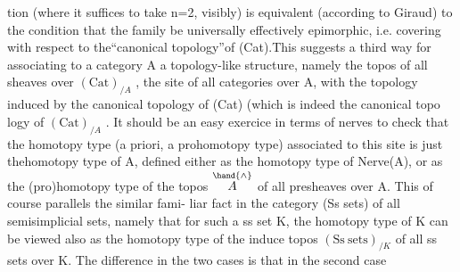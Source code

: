tion (where it suffices to take n=2,  visibly)  is equivalent (according
to Giraud) to the condition that the family be universally effectively
epimorphic,  i.e. covering with respect to the``canonical topology''of
(Cat).This suggests a third way for associating to a \inserted{[small]} category A a
topology-like structure,  namely the topos of all sheaves over
$(\mathrm{Cat})_{/A}$  ,  the site of all categories over A,  with the topology induced
by the canonical topology of (Cat)  (which is indeed the canonical topo\hand{-}%
logy of  $(\mathrm{Cat})_{/A}$ \hand{)}.  It should be an easy exercice in terms of nerves to
check that the homotopy type (a priori,  a prohomotopy type)  associated
to this site is just thehomotopy type of A,  defined either as the
homotopy type of Nerve(A),  or as the (pro)homotopy type of the topos
$\overset{\hand{\wedge}}{A}$ of all presheaves over A.  This of course parallels the similar fami-%
liar fact in the category (Ss sets) of all semisimplicial sets,  namely
that for such a ss set K,  the homotopy type of K can be viewed also
as the homotopy type of the induce topos  $(\mathrm{Ss\ sets})_{/K}$ of all ss sets
over K.  The difference in the two cases is that  in the second case
